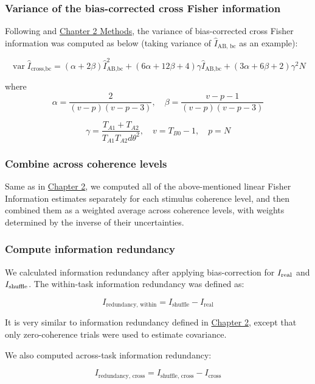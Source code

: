\documentclass[lineno,pdflatex,sn-basic]{sn-jnl}%
\newcommand{\Is}{I_{\rm shuffle}}
\newcommand{\Ir}{I_{\rm real}} %
\theoremstyle{thmstyleone}%
\theoremstyle{thmstyletwo}%
\theoremstyle{thmstylethree}%
\begin{document}
\subsubsection{Variance of the bias-corrected cross Fisher information}
Following \citet{kanitscheider2015measuring} and \hyperref[sec_ch1:supp_lisherfisherinfo]{Chapter 2 Methods}, the variance of bias-corrected cross Fisher information was computed as below (taking variance of $\hat{I}_\text{AB, bc}$ as an example):

\begin{equation}
\operatorname{var}\hat{I}_\text{cross,bc} = (\alpha+2\beta) \hat{I}_\text{AB,bc}^2 + 
                (6\alpha+12\beta+4)\gamma \hat{I}_\text{AB,bc} + 
                (3\alpha+6\beta+2)\gamma^2 N
\label{eq_varI_estimate}
\end{equation}

where
\[\alpha=\frac{2}{(v-p)(v-p-3)}, \quad \beta = \frac{v-p-1}{(v-p)(v-p-3)}\]

\[\gamma = \frac{T_{A1} + T_{A2}}{T_{A1} T_{A2} d\theta^2}, \quad v =T_{B0} - 1, \quad p = N\]

\subsubsection{Combine across coherence levels} Same as in \hyperref[sec_ch1: NA_fisher]{Chapter 2}, we computed all of the above-mentioned linear Fisher Information estimates separately for each stimulus coherence level, and then combined them as a weighted average across coherence levels, with weights determined by the inverse of their uncertainties.

\subsubsection{Compute information redundancy} We calculated information redundancy after applying bias-correction for $\Ir$ and $\Is$. The within-task information redundancy was defined as: 

\[ I_\textrm{redundancy, within} = I_\textrm{shuffle} - I_\textrm{real}\]

It is very similar to information redundancy defined in \hyperref[fig_ch1:conceptual]{Chapter 2}, except that only zero-coherence trials were used to estimate covariance.

We also computed across-task information redundancy:

\[ I_\textrm{redundancy, cross} = I_\textrm{shuffle, cross} - I_\textrm{cross}\]
\end{document}
